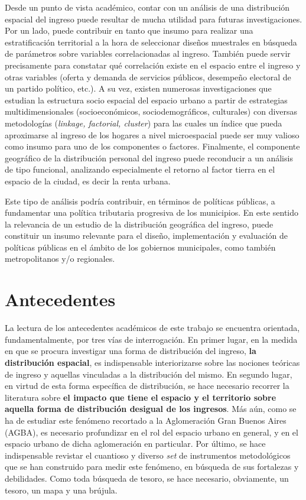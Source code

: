 Desde un punto de vista académico, contar con un análisis de una distribución espacial del ingreso puede resultar de mucha utilidad para futuras investigaciones. Por un lado, puede contribuir en tanto que insumo para realizar una estratificación territorial a la hora de seleccionar diseños muestrales en búsqueda de parámetros sobre variables correlacionadas al ingreso. También puede servir precisamente para constatar qué correlación existe en el espacio entre el ingreso y otras variables (oferta y demanda de servicios públicos, desempeño electoral de un partido político, etc.). A su vez, existen numerosas investigaciones que estudian la estructura socio espacial del espacio urbano a partir de estrategias multidimensionales (socioeconómicos, sociodemográficos, culturales) con diversas metodologías (\textit{linkage, factorial, cluster}) para las cuales un índice que pueda aproximarse al ingreso de los hogares a nivel microespacial puede ser muy valioso como insumo para uno de los componentes o factores. Finalmente, el componente geográfico de la distribución personal del ingreso puede reconducir a un análisis de tipo funcional, analizando especialmente el retorno al factor tierra en el espacio de la ciudad, es decir la renta urbana. 

Este tipo de análisis podría contribuir, en términos de políticas públicas, a fundamentar una política tributaria progresiva de los municipios. En este sentido la relevancia de un estudio de la distribución geográfica del ingreso, puede constituir un insumo relevante para el diseño, implementación y evaluación de políticas públicas en el ámbito de los gobiernos municipales, como también metropolitanos y/o regionales.


\section{Antecedentes}

La lectura de los antecedentes académicos de este trabajo se encuentra orientada, fundamentalmente, por tres vías de interrogación. En primer lugar, en la medida en que se procura investigar una forma de distribución del ingreso, \textbf{la distribución espacial}, es indispensable interiorizarse sobre las nociones teóricas de ingreso y aquellas vinculadas a la distribución del mismo. En segundo lugar, en virtud de esta forma específica de distribución, se hace necesario recorrer la literatura sobre \textbf{el impacto que tiene el espacio y el territorio sobre aquella forma de distribución desigual de los ingresos}. Más aún, como se ha de estudiar este fenómeno recortado a la Aglomeración Gran Buenos Aires (AGBA), es necesario profundizar en el rol del espacio urbano en general, y en el espacio urbano de dicha aglomeración en particular. Por último, se hace indispensable revistar el cuantioso y diverso \textit{set} de instrumentos metodológicos que se han construido para medir este fenómeno, en búsqueda de sus fortalezas y debilidades. Como toda búsqueda de tesoro, se hace necesario, obviamente, un tesoro, un mapa y una brújula.

